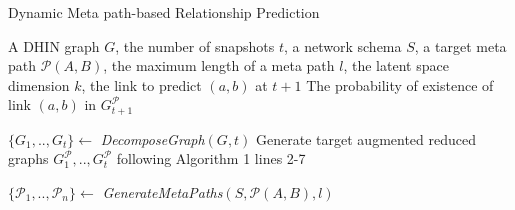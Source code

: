 






\begin{algorithm}[t]
\caption{Dynamic Meta path-based Relationship Prediction}\label{alg2}
\begin{algorithmic}[1]\scriptsize
\REQUIRE A DHIN graph $G$, the number of snapshots $t$, a network schema $S$, a target meta path $\mathcal{P}(A,B)$, the maximum length of a meta path $l$, the latent space dimension $k$, the link to predict $(a,b)$ at $t+1$
\ENSURE The probability of existence of link $(a,b)$ in $G^\mathcal{P}_{t+1}$

\STATE $\{G_1, .., G_t\} \leftarrow$ \textit{DecomposeGraph}$(G, t)$
\STATE  Generate target augmented reduced graphs $G^\mathcal{P}_1, .., G^\mathcal{P}_t$ following Algorithm 1 lines 2-7

\STATE $\{\mathcal{P}_1, .., \mathcal{P}_n\} \leftarrow$ \textit{GenerateMetaPaths}$(S, \mathcal{P}(A,B), l)$

%
%




\end{algorithmic}
\end{algorithm}
